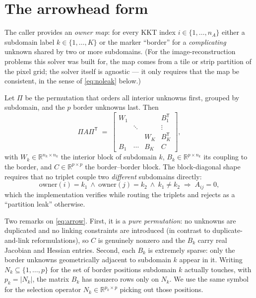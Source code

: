 \documentclass[11pt]{article}
\newcommand{\R}{\mathbb{R}}
\begin{document}
\section{The arrowhead form}
\label{sec:arrowhead}

The caller provides an \emph{owner map}: for every KKT index
$i \in \{1,\dots,n_A\}$ either a subdomain label $k \in \{1,\dots,K\}$ or the
marker ``border'' for a \emph{complicating} unknown shared by two or more
subdomains.  (For the image-reconstruction problems this solver was built for,
the map comes from a tile or strip partition of the pixel grid; the solver
itself is agnostic --- it only requires that the map be consistent, in the
sense of \eqref{eq:noleak} below.)

Let $\Pi$ be the permutation that orders all interior unknowns first, grouped
by subdomain, and the $p$ border unknowns last.  Then
\begin{equation}
  \Pi A \Pi^{\mathsf T}
  \;=\;
  \begin{bmatrix}
    W_1 &        &        & B_1^{\mathsf T}\\
        & \ddots &        & \vdots\\
        &        & W_K    & B_K^{\mathsf T}\\
    B_1 & \cdots & B_K    & C
  \end{bmatrix},
  \label{eq:arrow}
\end{equation}
with $W_k \in \R^{n_k\times n_k}$ the interior block of subdomain $k$,
$B_k \in \R^{p\times n_k}$ its coupling to the border, and
$C \in \R^{p\times p}$ the border--border block.  The block-diagonal shape
requires that no triplet couple two \emph{different} subdomains directly:
\begin{equation}
  \text{owner}(i) = k_1 \ \wedge\ \text{owner}(j) = k_2 \ \wedge\ k_1\ne k_2
  \;\Longrightarrow\; A_{ij} = 0 ,
  \label{eq:noleak}
\end{equation}
which the implementation verifies while routing the triplets and rejects as a
``partition leak'' otherwise.

Two remarks on \eqref{eq:arrow}.  First, it is a \emph{pure permutation}: no
unknowns are duplicated and no linking constraints are introduced (in contrast
to duplicate-and-link reformulations), so $C$ is genuinely nonzero and the
$B_k$ carry real Jacobian and Hessian entries.  Second, each $B_k$ is
extremely sparse: only the border unknowns geometrically adjacent to subdomain
$k$ appear in it.  Writing $N_k \subseteq \{1,\dots,p\}$ for the set of
border positions subdomain $k$ actually touches, with $p_k = |N_k|$, the
matrix $B_k$ has nonzero rows only on $N_k$.  We use the same symbol for the
selection operator $N_k \in \R^{p_k \times p}$ picking out those positions.
\end{document}
